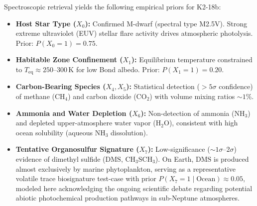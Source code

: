 Spectroscopic retrieval yields the following empirical priors for K2-18b:
\begin{itemize}
    \item \textbf{Host Star Type ($X_0$):} Confirmed M-dwarf (spectral type M2.5V). Strong extreme ultraviolet (EUV) stellar flare activity drives atmospheric photolysis. Prior: $P(X_0 = 1) = 0.75$.
    \item \textbf{Habitable Zone Confinement ($X_1$):} Equilibrium temperature constrained to $T_{\mathrm{eq}} \approx 250$--$300\,\mathrm{K}$ for low Bond albedo. Prior: $P(X_1 = 1) = 0.20$.
    \item \textbf{Carbon-Bearing Species ($X_4, X_5$):} Statistical detection ($>5\sigma$ confidence) of methane ($\mathrm{CH}_4$) and carbon dioxide ($\mathrm{CO}_2$) with volume mixing ratios $\sim 1\%$.
    \item \textbf{Ammonia and Water Depletion ($X_6$):} Non-detection of ammonia ($\mathrm{NH}_3$) and depleted upper-atmosphere water vapor ($\mathrm{H}_2\mathrm{O}$), consistent with high ocean solubility (aqueous $\mathrm{NH}_3$ dissolution).
    \item \textbf{Tentative Organosulfur Signature ($X_7$):} Low-significance ($\sim 1\sigma$--$2\sigma$) evidence of dimethyl sulfide ($\mathrm{DMS}$, $\mathrm{CH}_3\mathrm{SCH}_3$). On Earth, $\mathrm{DMS}$ is produced almost exclusively by marine phytoplankton, serving as a representative volatile trace biosignature test-case with prior $P(X_7 = 1 \mid \text{Ocean}) \approx 0.05$, modeled here acknowledging the ongoing scientific debate regarding potential abiotic photochemical production pathways in sub-Neptune atmospheres.
\end{itemize}

